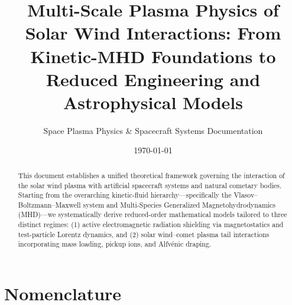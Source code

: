 \documentclass[11pt,a4paper]{article}
\title{\textbf{Multi-Scale Plasma Physics of Solar Wind Interactions: From Kinetic-MHD Foundations to Reduced Engineering and Astrophysical Models}}
\author{Space Plasma Physics \& Spacecraft Systems Documentation}
\date{\today}
\begin{document}
\maketitle

\begin{abstract}
This document establishes a unified theoretical framework governing the interaction of the solar wind plasma with artificial spacecraft systems and natural cometary bodies. Starting from the overarching kinetic-fluid hierarchy—specifically the Vlasov--Boltzmann--Maxwell system and Multi-Species Generalized Magnetohydrodynamics (MHD)—we systematically derive reduced-order mathematical models tailored to three distinct regimes: (1) active electromagnetic radiation shielding via magnetostatics and test-particle Lorentz dynamics, and (2) solar wind--comet plasma tail interactions incorporating mass loading, pickup ions, and Alfvénic draping.
\end{abstract}

\tableofcontents
\newpage

\section*{Nomenclature}
\end{document}
